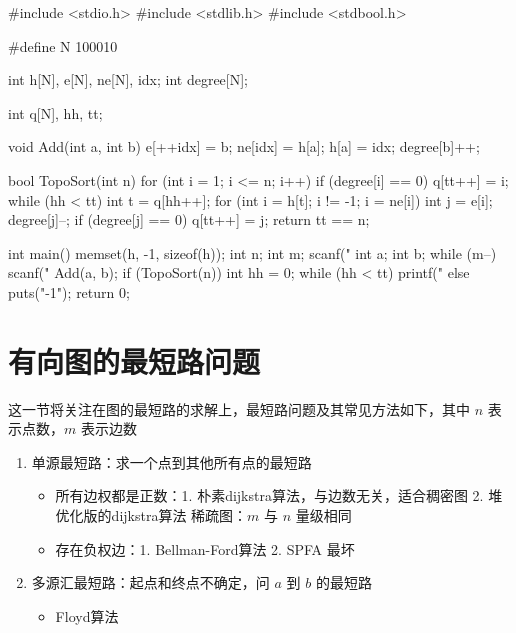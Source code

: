 \begin{mycpptwocol}[拓扑排序]
    #include <stdio.h>
    #include <stdlib.h>
    #include <stdbool.h>

    #define N 100010

    int h[N], e[N], ne[N], idx;
    int degree[N];

    int q[N], hh, tt;

    void Add(int a, int b) {
        e[++idx] = b;
        ne[idx] = h[a];
        h[a] = idx;
        degree[b]++;
    }

    bool TopoSort(int n) {
        for (int i = 1; i <= n; i++) {
            if (degree[i] == 0) {
                q[tt++] = i;
            }
        }
        while (hh < tt) {
            int t = q[hh++];
            for (int i = h[t]; i != -1; i = ne[i]) {
                int j = e[i];
                degree[j]--;
                if (degree[j] == 0) {
                    q[tt++] = j;
                }
            }
        }
        return tt == n;
    }

    int main() {
        memset(h, -1, sizeof(h));
        int n;
        int m;
        scanf("%
        int a;
        int b;
        while (m--) {
            scanf("%
            Add(a, b);
        }
        if (TopoSort(n)) {
            int hh = 0;
            while (hh < tt) {
                printf("%
            }
        } else {
            puts("-1");
        }
        return 0;
    }
\end{mycpptwocol}


\section{有向图的最短路问题}
这一节将关注在图的最短路的求解上，最短路问题及其常见方法如下，其中 $n$ 表示点数，$m$ 表示边数

\begin{enumerate}
    \item 单源最短路：求一个点到其他所有点的最短路
    \begin{itemize}
        \item 所有边权都是正数：1. 朴素dijkstra算法，与边数无关，适合稠密图 2. 堆优化版的dijkstra算法  稀疏图：$m$ 与 $n$ 量级相同
        \item 存在负权边：1. Bellman-Ford算法  2. SPFA 最坏 
    \end{itemize}
    \item 多源汇最短路：起点和终点不确定，问 $a$ 到 $b$ 的最短路
    \begin{itemize}
        \item Floyd算法 
    \end{itemize}
\end{enumerate}

